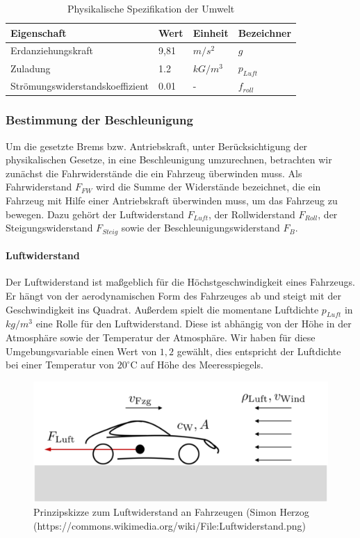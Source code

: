 \documentclass[12pt,a4paper,bibliography=totocnumbered,listof=totocnumbered, abstracton]{scrartcl}
\theoremstyle{Umgebung}
\begin{document}
\begin{table}[]
	\centering
	\caption{Physikalische Spezifikation der Umwelt}
	\label{table:physics}
	\begin{tabular}{@{}llll@{}}
		\toprule
		Eigenschaft                     & Wert & Einheit & Bezeichner           \\ \midrule
		Erdanziehungskraft	            & 9,81 & $m/s^2$    & $g$            \\
		Zuladung                        & 1.2  & $kG/m^3$   & $p_{Luft}$             \\
		Strömungswiderstandskoeffizient & 0.01 & -       & $f_{roll}$                 \\ \bottomrule       
	\end{tabular}
\end{table}

\subsubsection{Bestimmung der Beschleunigung}

Um die gesetzte Brems bzw. Antriebskraft, unter Berücksichtigung der physikalischen Gesetze, in eine Beschleunigung umzurechnen, betrachten wir zunächst die Fahrwiderstände die ein Fahrzeug überwinden muss. Als Fahrwiderstand $F_{FW}$ wird die Summe der Widerstände bezeichnet, die ein Fahrzeug mit Hilfe einer Antriebskraft überwinden muss, um das Fahrzeug zu bewegen. Dazu gehört der Luftwiderstand $F_{Luft}$, der Rollwiderstand $F_{Roll}$, der Steigungswiderstand $F_{Steig}$ sowie der Beschleunigungswiderstand $F_{B}$.

\paragraph{Luftwiderstand}

Der Luftwiderstand ist maßgeblich für die Höchstgeschwindigkeit eines Fahrzeugs. Er hängt von der aerodynamischen Form des Fahrzeuges ab und steigt mit der Geschwindigkeit ins Quadrat. Außerdem spielt die momentane Luftdichte $p_{Luft}$ in $kg/m^3$ eine Rolle für den Luftwiderstand. Diese ist abhängig von der Höhe in der Atmosphäre sowie der Temperatur der Atmosphäre.  Wir haben für diese Umgebungsvariable einen Wert von $1,2$ gewählt, dies entspricht der Luftdichte bei einer Temperatur von $20^\circ\text{C}$ auf Höhe des Meeresspiegels.

\begin{figure}
	\centering
	\includegraphics[width=0.7\linewidth]{img/practical/Luftwiderstand}
	\caption{Prinzipskizze zum Luftwiderstand an Fahrzeugen (Simon Herzog (https://commons.wikimedia.org/wiki/File:Luftwiderstand.png)}
	\label{fig:luftwiderstand}
\end{figure}
\end{document}
